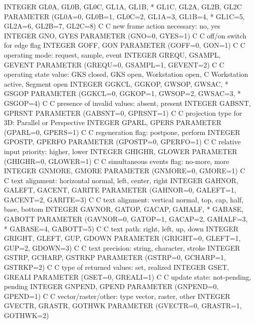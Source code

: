 \begin{XMP}
      INTEGER     GL0A,    GL0B,    GL0C,    GL1A,   GL1B,
     *            GL1C,    GL2A,    GL2B,    GL2C
      PARAMETER  (GL0A=0,  GL0B=1,  GL0C=2,  GL1A=3, GL1B=4,
     *            GL1C=5,  GL2A=6,  GL2B=7,  GL2C=8)
C
C new frame action necessary: no, yes
      INTEGER     GNO,       GYES
      PARAMETER  (GNO=0,     GYES=1)
C
C off/on switch for edge flag
      INTEGER     GOFF,      GON
      PARAMETER  (GOFF=0,    GON=1)
C
C operating mode:     request,    sample,    event
      INTEGER     GREQU,      GSAMPL,    GEVENT
      PARAMETER  (GREQU=0,    GSAMPL=1,  GEVENT=2)
C
C operating state value: GKS closed, GKS open, Workstation open,
C                 Workstation active, Segment open
      INTEGER     GGKCL,     GGKOP,     GWSOP,     GWSAC,
     *            GSGOP
      PARAMETER  (GGKCL=0,   GGKOP=1,   GWSOP=2,   GWSAC=3,
     *            GSGOP=4)
C
C presence of invalid values:  absent, present
      INTEGER     GABSNT,    GPRSNT
      PARAMETER  (GABSNT=0,  GPRSNT=1)
C
C projection type for 3D: Parallel or Perspective
      INTEGER     GPARL,     GPERS
      PARAMETER  (GPARL=0,   GPERS=1)
C
C regeneration flag:   postpone,   perform
      INTEGER     GPOSTP,    GPERFO
      PARAMETER  (GPOSTP=0,  GPERFO=1)
C
C relative input priority:  higher,  lower
      INTEGER     GHIGHR,    GLOWER
      PARAMETER  (GHIGHR=0,  GLOWER=1)
C
C simultaneous events flag: no-more, more
      INTEGER     GNMORE,   GMORE
      PARAMETER  (GNMORE=0, GMORE=1)
C
C text alignment: horizontal normal, left, center, right
      INTEGER     GAHNOR,    GALEFT,    GACENT,    GARITE
      PARAMETER  (GAHNOR=0,  GALEFT=1,  GACENT=2,  GARITE=3)
C
C text alignment: vertical  normal, top, cap, half, base, bottom
      INTEGER     GAVNOR,    GATOP,     GACAP,     GAHALF,
     *            GABASE,    GABOTT
      PARAMETER  (GAVNOR=0,  GATOP=1,   GACAP=2,   GAHALF=3,
     *            GABASE=4,  GABOTT=5)
C
C text path:    right,  left,   up,   down
      INTEGER     GRIGHT,    GLEFT,     GUP,       GDOWN
      PARAMETER  (GRIGHT=0,  GLEFT=1,   GUP=2,     GDOWN=3)
C
C text precision:     string,   character,   stroke
      INTEGER     GSTRP,     GCHARP,    GSTRKP
      PARAMETER  (GSTRP=0,   GCHARP=1,  GSTRKP=2)
C
C type of returned values:  set, realized
      INTEGER     GSET,      GREALI
      PARAMETER  (GSET=0,    GREALI=1)
C
C update state:     not-pending, pending
      INTEGER     GNPEND,    GPEND
      PARAMETER  (GNPEND=0,  GPEND=1)
C
C vector/raster/other: type vector, raster, other
      INTEGER     GVECTR,    GRASTR,    GOTHWK
      PARAMETER  (GVECTR=0,  GRASTR=1,  GOTHWK=2)

\end{XMP}
